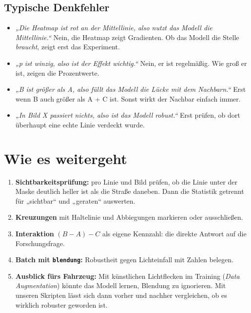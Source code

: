 \documentclass[11pt,a4paper]{article}
\newcommand{\code}[1]{\texttt{#1}}
\begin{document}
\subsection{Typische Denkfehler}

\begin{achtung}
\begin{itemize}[leftmargin=1.2em]
  \item \emph{„Die Heatmap ist rot an der Mittellinie, also nutzt das Modell die Mittellinie.“}
        Nein, die Heatmap zeigt Gradienten. Ob das Modell die Stelle \emph{braucht}, zeigt erst
        das Experiment.
  \item \emph{„p ist winzig, also ist der Effekt wichtig.“} Nein, er ist regelmäßig. Wie groß er
        ist, zeigen die Prozentwerte.
  \item \emph{„B ist größer als A, also füllt das Modell die Lücke mit dem Nachbarn.“} Erst wenn B
        auch größer als A + C ist. Sonst wirkt der Nachbar einfach immer.
  \item \emph{„In Bild X passiert nichts, also ist das Modell robust.“} Erst prüfen, ob dort
        überhaupt eine echte Linie verdeckt wurde.
\end{itemize}
\end{achtung}

\section{Wie es weitergeht}

\begin{enumerate}
  \item \textbf{Sichtbarkeitsprüfung:} pro Linie und Bild prüfen, ob die Linie unter der Maske
        deutlich heller ist als die Straße daneben. Dann die Statistik getrennt für „sichtbar“
        und „geraten“ auswerten.
  \item \textbf{Kreuzungen} mit Haltelinie und Abbiegungen markieren oder ausschließen.
  \item \textbf{Interaktion} $(B-A)-C$ als eigene Kennzahl: die direkte Antwort auf die
        Forschungsfrage.
  \item \textbf{Batch mit \code{blendung}:} Robustheit gegen Lichteinfall mit Zahlen belegen.
  \item \textbf{Ausblick fürs Fahrzeug:} Mit künstlichen Lichtflecken im Training (\emph{Data
        Augmentation}) könnte das Modell lernen, Blendung zu ignorieren. Mit unseren Skripten
        lässt sich dann vorher und nachher vergleichen, ob es wirklich robuster geworden ist.
\end{enumerate}
\end{document}

